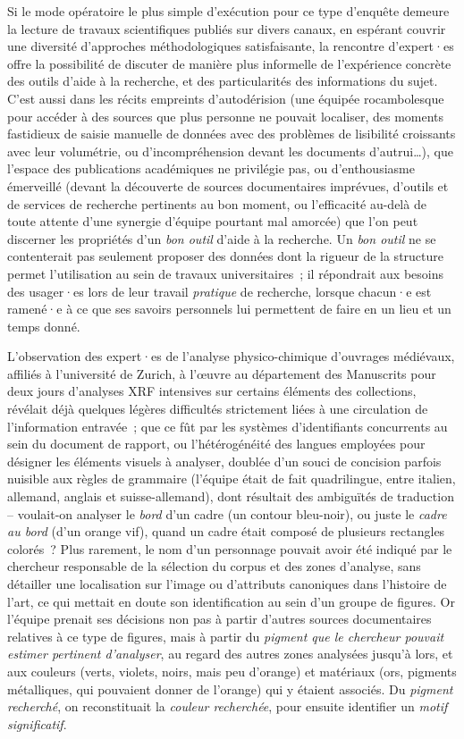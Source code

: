 \documentclass[a4paper,12pt, twoside]{book}
\begin{document}
Si le mode opératoire le plus simple d’exécution pour ce type d’enquête demeure la lecture de travaux scientifiques publiés sur divers canaux, en espérant couvrir une diversité d’approches méthodologiques satisfaisante, la rencontre d’expert·es offre la possibilité de discuter de manière plus informelle de l’expérience concrète des outils d’aide à la recherche, et des particularités des informations du sujet. C’est aussi dans les récits empreints d’autodérision (une équipée rocambolesque pour accéder à des sources que plus personne ne pouvait localiser, des moments fastidieux de saisie manuelle de données avec des problèmes de lisibilité croissants avec leur volumétrie, ou d’incompréhension devant les documents d’autrui…), que l’espace des publications académiques ne privilégie pas, ou d’enthousiasme émerveillé (devant la découverte de sources documentaires imprévues, d’outils et de services de recherche pertinents au bon moment, ou l’efficacité au-delà de toute attente d’une synergie d’équipe pourtant mal amorcée) que l’on peut discerner les propriétés d’un \textit{bon outil} d’aide à la recherche. Un \textit{bon outil} ne se contenterait pas seulement proposer des données dont la rigueur de la structure permet l’utilisation au sein de travaux universitaires~; il répondrait aux besoins des usager·es lors de leur travail \textit{pratique} de recherche, lorsque chacun·e est ramené·e à ce que ses savoirs personnels lui permettent de faire en un lieu et un temps donné.

L’observation des expert·es de l’analyse physico-chimique d’ouvrages médiévaux, affiliés à l’université de Zurich, à l’œuvre au département des Manuscrits pour deux jours d’analyses XRF intensives sur certains éléments des collections, révélait déjà quelques légères difficultés strictement liées à une circulation de l’information entravée~; que ce fût par les systèmes d’identifiants concurrents au sein du document de rapport, ou l’hétérogénéité des langues employées pour désigner les éléments visuels à analyser, doublée d’un souci de concision parfois nuisible aux règles de grammaire (l’équipe était de fait quadrilingue, entre italien, allemand, anglais et suisse-allemand), dont résultait des ambiguïtés de traduction – voulait-on analyser le \textit{bord} d’un cadre (un contour bleu-noir), ou juste le \textit{cadre au bord} (d’un orange vif), quand un cadre était composé de plusieurs rectangles colorés~? Plus rarement, le nom d’un personnage pouvait avoir été indiqué par le chercheur responsable de la sélection du corpus et des zones d’analyse, sans détailler une localisation sur l’image ou d’attributs canoniques dans l’histoire de l’art, ce qui mettait en doute son identification au sein d’un groupe de figures. Or l’équipe prenait ses décisions non pas à partir d’autres sources documentaires relatives à ce type de figures, mais à partir du \textit{pigment que le chercheur pouvait estimer pertinent d’analyser}, au regard des autres zones analysées jusqu’à lors, et aux couleurs (verts, violets, noirs, mais peu d’orange) et matériaux (ors, pigments métalliques, qui pouvaient donner de l’orange) qui y étaient associés. Du \textit{pigment recherché}, on reconstituait la \textit{couleur recherchée}, pour ensuite identifier un \textit{motif significatif}.
\end{document}
